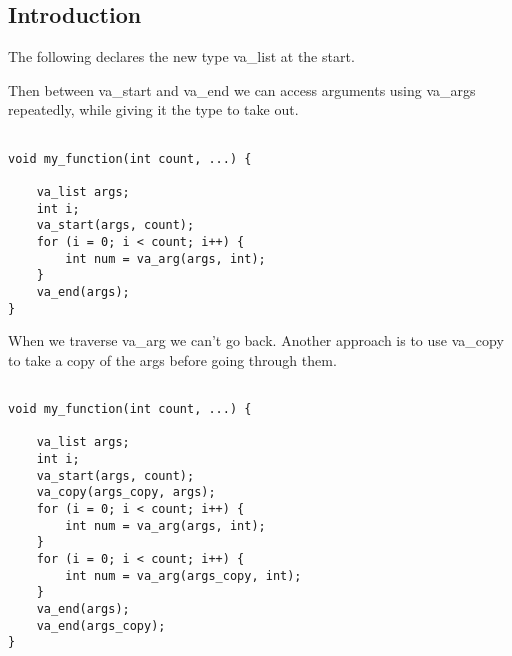 
\subsection{Introduction}

The following declares the new type va\_list at the start.

Then between va\_start and va\_end we can access arguments using va\_args repeatedly, while giving it the type to take out.

\begin{verbatim}

void my_function(int count, ...) {

    va_list args;
    int i;
    va_start(args, count);
    for (i = 0; i < count; i++) {
        int num = va_arg(args, int);
    }
    va_end(args);
}

\end{verbatim}

When we traverse va\_arg we can't go back. Another approach is to use va\_copy to take a copy of the args before going through them.


\begin{verbatim}

void my_function(int count, ...) {

    va_list args;
    int i;
    va_start(args, count);
    va_copy(args_copy, args);
    for (i = 0; i < count; i++) {
        int num = va_arg(args, int);
    }
    for (i = 0; i < count; i++) {
        int num = va_arg(args_copy, int);
    }
    va_end(args);
    va_end(args_copy);
}

\end{verbatim}

